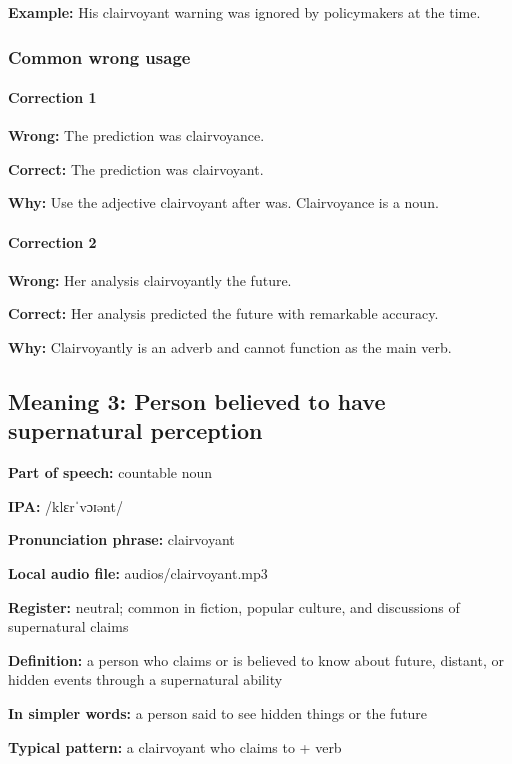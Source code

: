 \documentclass[11pt]{article}
\begin{document}
\textbf{Example:} His clairvoyant warning was ignored by policymakers at the time.

\subsubsection{Common wrong usage}
\paragraph{Correction 1}
\textbf{Wrong:} The prediction was clairvoyance.

\textbf{Correct:} The prediction was clairvoyant.

\textbf{Why:} Use the adjective clairvoyant after was. Clairvoyance is a noun.

\paragraph{Correction 2}
\textbf{Wrong:} Her analysis clairvoyantly the future.

\textbf{Correct:} Her analysis predicted the future with remarkable accuracy.

\textbf{Why:} Clairvoyantly is an adverb and cannot function as the main verb.

\subsection{Meaning 3: Person believed to have supernatural perception}
\textbf{Part of speech:} countable noun

\textbf{IPA:} /klɛrˈvɔɪənt/

\textbf{Pronunciation phrase:} clairvoyant

\textbf{Local audio file:} audios/clairvoyant.mp3

\textbf{Register:} neutral; common in fiction, popular culture, and discussions of supernatural claims

\textbf{Definition:} a person who claims or is believed to know about future, distant, or hidden events through a supernatural ability

\textbf{In simpler words:} a person said to see hidden things or the future

\textbf{Typical pattern:} a clairvoyant who claims to + verb
\end{document}
